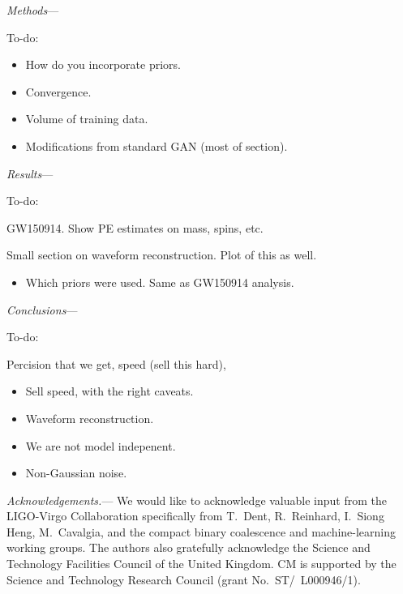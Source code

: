 \documentclass[%
showpacs,
 amsmath,amssymb,
 aps,
 twocolumn,
 prl,
 reprint,
floatfix,
]{revtex4-1}
\begin{document}
\textit{Methods}---


To-do:

\begin{itemize}
\item How do you incorporate priors.
\item Convergence.
\item Volume of training data.
\item Modifications from standard GAN (most of section).
\end{itemize}

\textit{Results}---


To-do:

GW150914. Show PE estimates on mass, spins, etc.

Small section on waveform reconstruction. Plot of this as well.  

\begin{itemize}
\item Which priors were used. Same as GW150914 analysis.
\end{itemize}
\textit{Conclusions}---

To-do:

Percision that we get, speed (sell this hard), 

\begin{itemize}
\item Sell speed, with the right caveats.
\item Waveform reconstruction.
\item We are not model indepenent.
\item Non-Gaussian noise.
\end{itemize}

%
%
\emph{Acknowledgements.}---
%
We would like to acknowledge valuable input from the LIGO-Virgo Collaboration
specifically from T.~Dent, R.~Reinhard, I.~Siong Heng, M.~Cavalgia, and the compact binary coalescence and
machine-learning working groups. The authors also gratefully acknowledge the
Science and Technology Facilities Council of the United Kingdom. CM is
supported by the Science and Technology Research Council (grant
No.~ST/~L000946/1).
%




\end{document}

